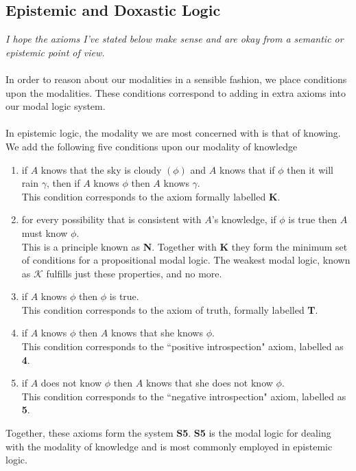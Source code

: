 \documentclass[12pt, a4paper, twoside]{article}
\begin{document}
\subsection{Epistemic and Doxastic Logic}\label{epistemic_logics}
{\em I hope the axioms I've stated below make sense and are okay from a
	semantic or epistemic point of view.}\\
\\
In order to reason about our modalities in a sensible fashion, we place
conditions upon the modalities.
These conditions correspond to adding in extra axioms into our modal logic
system. \citep{hoek2008dynamic}\\
\\
In epistemic logic, the modality we are most concerned with is that of knowing.
We add the following five conditions upon our modality of knowledge
\begin{enumerate}
	\item if $A$ knows that the sky is cloudy $(\phi)$ and $A$ knows that if
	$\phi$ then it will rain $\gamma$, then if $A$ knows $\phi$ then $A$ knows
	$\gamma$.\\
	This condition corresponds to the axiom formally labelled {\bf K}.
	\item for every possibility that is consistent with $A$'s knowledge, if $\phi$
	is true then $A$ must know $\phi$.\\
	This is a principle known as {\bf N}.
	Together with {\bf K} they form the minimum set of conditions for a
	propositional modal logic.
	The weakest modal logic, known as $\mathcal{K}$ fulfills just these
	properties, and no more.
	\item if $A$ knows $\phi$ then $\phi$ is true.\\
	This condition corresponds to the axiom of truth, formally labelled {\bf T}.
	\item if $A$ knows $\phi$ then $A$ knows that she knows $\phi$.\\
	This condition corresponds to the ``positive introspection" axiom, labelled 
	as {\bf 4}.
	\item if $A$ does not know $\phi$ then $A$ knows that she does not know
	$\phi$.\\
	This condition corresponds to the ``negative introspection" axiom, labelled 
	as {\bf 5}.
\end{enumerate}
Together, these axioms form the system {\bf S5}.
{\bf S5} is the modal logic for dealing with the modality of knowledge and is
most commonly employed in epistemic logic.\\
\end{document}
